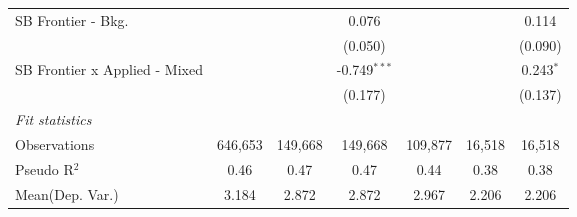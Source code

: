 \begin{tabular}{lcccccc}
   SB Frontier - Bkg.            &               &               & 0.076          &               &               & 0.114\\   
                                 &               &               & (0.050)        &               &               & (0.090)\\   
   SB Frontier x Applied - Mixed &               &               & -0.749$^{***}$ &               &               & 0.243$^{*}$\\   
                                 &               &               & (0.177)        &               &               & (0.137)\\   
   \midrule
   \emph{Fit statistics}\\
   Observations                  & 646,653       & 149,668       & 149,668        & 109,877       & 16,518        & 16,518\\  
   Pseudo R$^2$                  & 0.46          & 0.47          & 0.47           & 0.44          & 0.38          & 0.38\\  
Mean(Dep. Var.) & 3.184 & 2.872 & 2.872 & 2.967 & 2.206 & 2.206 \\
   

\end{tabular}
